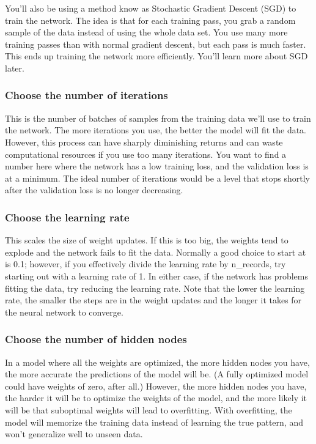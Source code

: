 \documentclass[11pt]{article}
\begin{document}
You'll also be using a method know as Stochastic Gradient Descent (SGD)
to train the network. The idea is that for each training pass, you grab
a random sample of the data instead of using the whole data set. You use
many more training passes than with normal gradient descent, but each
pass is much faster. This ends up training the network more efficiently.
You'll learn more about SGD later.

\hypertarget{choose-the-number-of-iterations}{%
\subsubsection{Choose the number of
iterations}\label{choose-the-number-of-iterations}}

This is the number of batches of samples from the training data we'll
use to train the network. The more iterations you use, the better the
model will fit the data. However, this process can have sharply
diminishing returns and can waste computational resources if you use too
many iterations. You want to find a number here where the network has a
low training loss, and the validation loss is at a minimum. The ideal
number of iterations would be a level that stops shortly after the
validation loss is no longer decreasing.

\hypertarget{choose-the-learning-rate}{%
\subsubsection{Choose the learning
rate}\label{choose-the-learning-rate}}

This scales the size of weight updates. If this is too big, the weights
tend to explode and the network fails to fit the data. Normally a good
choice to start at is 0.1; however, if you effectively divide the
learning rate by n\_records, try starting out with a learning rate of 1.
In either case, if the network has problems fitting the data, try
reducing the learning rate. Note that the lower the learning rate, the
smaller the steps are in the weight updates and the longer it takes for
the neural network to converge.

\hypertarget{choose-the-number-of-hidden-nodes}{%
\subsubsection{Choose the number of hidden
nodes}\label{choose-the-number-of-hidden-nodes}}

In a model where all the weights are optimized, the more hidden nodes
you have, the more accurate the predictions of the model will be. (A
fully optimized model could have weights of zero, after all.) However,
the more hidden nodes you have, the harder it will be to optimize the
weights of the model, and the more likely it will be that suboptimal
weights will lead to overfitting. With overfitting, the model will
memorize the training data instead of learning the true pattern, and
won't generalize well to unseen data.
\end{document}

